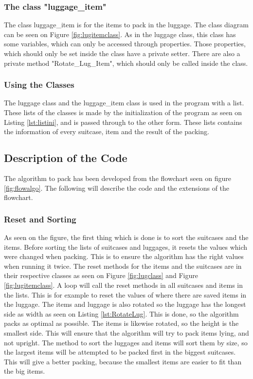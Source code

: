 \subsubsection{The class "luggage\_item"}
The class luggage\_item is for the items to pack in the luggage. The class diagram can be seen on Figure \ref{fig:lugitemclass}. As in the luggage class, this class has some variables, which can only be accessed through properties. Those properties, which should only be set inside the class have a private setter. There are also a private method "Rotate\_Lug\_Item", which should only be called inside the class.
\subsubsection{Using the Classes}
The luggage class and the luggage\_item class is used in the program with a list. These lists of the classes is made by the initialization of the program as seen on Listing \ref{lst:listini}, and is passed through to the other form. These lists contains the information of every suitcase, item and the result of the packing.
\subsection{Description of the Code}
The algorithm to pack has been developed from the flowchart seen on figure \ref{fig:flowalgo}. The following will describe the code and the extensions of the flowchart.
\subsubsection{Reset and Sorting}
As seen on the figure, the first thing which is done is to sort the suitcases and the items. Before sorting the lists of suitcases and luggages, it resets the values which were changed when packing. This is to ensure the algorithm has the right values when running it twice. The reset methods for the items and the suitcases are in their respective classes as seen on Figure \ref{fig:lugclass} and Figure \ref{fig:lugitemclass}. A loop will call the reset methods in all suitcases and items in the lists. This is for example to reset the values of where there are saved items in the luggage. The items and luggage is also rotated so the luggage has the longest side as width as seen on Listing \ref{lst:RotateLug}. This is done, so the algorithm packs as optimal as possible. The items is likewise rotated, so the height is the smallest side. This will ensure that the algorithm will try to pack items lying, and not upright.
The method to sort the luggages and items will sort them by size, so the largest items will be attempted to be packed first in the biggest suitcases. This will give a better packing, because the smallest items are easier to fit than the big items.
